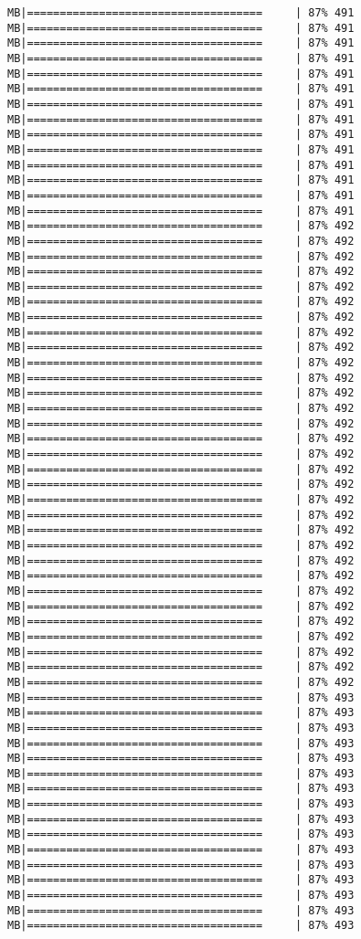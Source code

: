 \documentclass[
]{article}
\begin{document}
\begin{verbatim}
MB|====================================     | 87% 491 MB|====================================     | 87% 491 MB|====================================     | 87% 491 MB|====================================     | 87% 491 MB|====================================     | 87% 491 MB|====================================     | 87% 491 MB|====================================     | 87% 491 MB|====================================     | 87% 491 MB|====================================     | 87% 491 MB|====================================     | 87% 491 MB|====================================     | 87% 491 MB|====================================     | 87% 491 MB|====================================     | 87% 491 MB|====================================     | 87% 491 MB|====================================     | 87% 492 MB|====================================     | 87% 492 MB|====================================     | 87% 492 MB|====================================     | 87% 492 MB|====================================     | 87% 492 MB|====================================     | 87% 492 MB|====================================     | 87% 492 MB|====================================     | 87% 492 MB|====================================     | 87% 492 MB|====================================     | 87% 492 MB|====================================     | 87% 492 MB|====================================     | 87% 492 MB|====================================     | 87% 492 MB|====================================     | 87% 492 MB|====================================     | 87% 492 MB|====================================     | 87% 492 MB|====================================     | 87% 492 MB|====================================     | 87% 492 MB|====================================     | 87% 492 MB|====================================     | 87% 492 MB|====================================     | 87% 492 MB|====================================     | 87% 492 MB|====================================     | 87% 492 MB|====================================     | 87% 492 MB|====================================     | 87% 492 MB|====================================     | 87% 492 MB|====================================     | 87% 492 MB|====================================     | 87% 492 MB|====================================     | 87% 492 MB|====================================     | 87% 492 MB|====================================     | 87% 492 MB|====================================     | 87% 493 MB|====================================     | 87% 493 MB|====================================     | 87% 493 MB|====================================     | 87% 493 MB|====================================     | 87% 493 MB|====================================     | 87% 493 MB|====================================     | 87% 493 MB|====================================     | 87% 493 MB|====================================     | 87% 493 MB|====================================     | 87% 493 MB|====================================     | 87% 493 MB|====================================     | 87% 493 MB|====================================     | 87% 493 MB|====================================     | 87% 493 MB|====================================     | 87% 493 MB|====================================     | 87% 493 
\end{verbatim}
\end{document}
